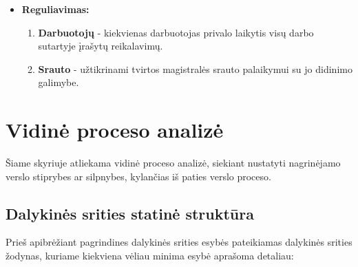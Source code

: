 \documentclass[12pt]{article}
\begin{document}
	\begin{itemize}

	\item{\textbf{Reguliavimas:}}
	\begin{enumerate}
		\item{\textbf{Darbuotojų} - kiekvienas darbuotojas privalo laikytis visų darbo sutartyje įrašytų reikalavimų.}
		\item{\textbf{Srauto} - užtikrinami tvirtos magistralės srauto palaikymui su jo didinimo galimybe.}
	\end{enumerate}
	\end{itemize}
	\pagebreak

	\section{Vidinė proceso analizė}
	
	Šiame skyriuje atliekama vidinė proceso analizė, siekiant nustatyti nagrinėjamo verslo stiprybes ar silpnybes, kylančias iš paties verslo proceso.
	
	\subsection{Dalykinės srities statinė struktūra}
	
	Prieš apibrėžiant pagrindines dalykinės srities esybės pateikiamas dalykinės srities žodynas, kuriame kiekviena vėliau minima esybė aprašoma detaliau:
	
\end{document}
